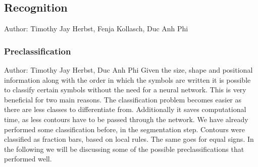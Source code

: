 \documentclass[12pt]{article}
\begin{document}
	\subsection{Recognition}
	\small{Author: Timothy Jay Herbst, Fenja Kollasch, Duc Anh Phi} \newline \newline
	\subsubsection{Preclassification}
	\small{Author: Timothy Jay Herbst, Duc Anh Phi} \newline \newline
	Given the size, shape and positional information along with the order in which the symbols are written it is possible to classify certain symbols without the need for a neural network. This is very beneficial for two main reasons. The classification problem becomes easier as there are less classes to differentiate from. Additionally it saves computational time, as less contours have to be passed through the network.
	We have already performed some classification before, in the segmentation step. Contours were classified as fraction bars, based on local rules. The same goes for equal signs. In the following we will be discussing some of the possible preclassifications that performed well.
	
\end{document}

